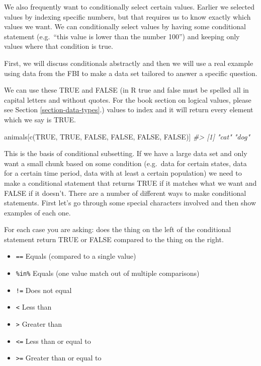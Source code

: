 \documentclass[
]{krantz}
\makeatletter
\newenvironment{Shaded}{\begin{snugshade}}{\end{snugshade}}
\newcommand{\CommentTok}[1]{\textcolor[rgb]{0.37,0.37,0.37}{\textit{#1}}}
\newcommand{\ConstantTok}[1]{\textcolor[rgb]{0,0,0}{#1}}
\newcommand{\FunctionTok}[1]{\textcolor[rgb]{0,0,0}{#1}}
\newcommand{\NormalTok}[1]{#1}
\providecommand{\tightlist}{%
  \setlength{\itemsep}{0pt}\setlength{\parskip}{0pt}}
\newenvironment{kframe}{%
\medskip{}
\setlength{\fboxsep}{.8em}
 \def\at@end@of@kframe{}%
 \ifinner\ifhmode%
  \def\at@end@of@kframe{\end{minipage}}%
  \begin{minipage}{\columnwidth}%
 \fi\fi%
 \def\FrameCommand##1{\hskip\@totalleftmargin \hskip-\fboxsep
 \colorbox{shadecolor}{##1}\hskip-\fboxsep
     \hskip-\linewidth \hskip-\@totalleftmargin \hskip\columnwidth}%
 \MakeFramed {\advance\hsize-\width
   \@totalleftmargin\z@ \linewidth\hsize
   \@setminipage}}%
 {\par\unskip\endMakeFramed%
 \at@end@of@kframe}
\renewenvironment{Shaded}{\begin{kframe}}{\end{kframe}}
\makeatother
\begin{document}
We also frequently want to conditionally select certain values. Earlier we selected values by indexing specific numbers, but that requires us to know exactly which values we want. We can conditionally select values by having some conditional statement (e.g.~``this value is lower than the number 100'') and keeping only values where that condition is true.

First, we will discuss conditionals abstractly and then we will use a real example using data from the FBI to make a data set tailored to answer a specific question.

We can use these TRUE and FALSE (in R true and false must be spelled all in capital letters and without quotes. For the book section on logical values, please see Section \ref{section-data-types}.) values to index and it will return every element which we say is TRUE.

\begin{Shaded}
\begin{Highlighting}[]
\NormalTok{animals[}\FunctionTok{c}\NormalTok{(}\ConstantTok{TRUE}\NormalTok{, }\ConstantTok{TRUE}\NormalTok{, }\ConstantTok{FALSE}\NormalTok{, }\ConstantTok{FALSE}\NormalTok{, }\ConstantTok{FALSE}\NormalTok{, }\ConstantTok{FALSE}\NormalTok{)]}
\CommentTok{\#\textgreater{} [1] "cat" "dog"}
\end{Highlighting}
\end{Shaded}

This is the basis of conditional subsetting. If we have a large data set and only want a small chunk based on some condition (e.g.~data for certain states, data for a certain time period, data with at least a certain population) we need to make a conditional statement that returns TRUE if it matches what we want and FALSE if it doesn't. There are a number of different ways to make conditional statements. First let's go through some special characters involved and then show examples of each one.

For each case you are asking: does the thing on the left of the conditional statement return TRUE or FALSE compared to the thing on the right.

\begin{itemize}
\tightlist
\item
  \texttt{==} Equals (compared to a single value)
\item
  \texttt{\%in\%} Equals (one value match out of multiple comparisons)
\item
  \texttt{!=} Does not equal
\item
  \texttt{\textless{}} Less than
\item
  \texttt{\textgreater{}} Greater than
\item
  \texttt{\textless{}=} Less than or equal to
\item
  \texttt{\textgreater{}=} Greater than or equal to
\end{itemize}
\end{document}
